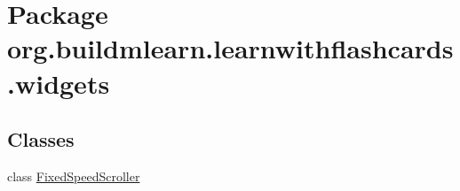 \hypertarget{namespaceorg_1_1buildmlearn_1_1learnwithflashcards_1_1widgets}{}\section{Package org.\+buildmlearn.\+learnwithflashcards.\+widgets}
\label{namespaceorg_1_1buildmlearn_1_1learnwithflashcards_1_1widgets}
\subsection*{Classes}
\begin{DoxyCompactItemize}
\item 
class \hyperlink{classorg_1_1buildmlearn_1_1learnwithflashcards_1_1widgets_1_1FixedSpeedScroller}{Fixed\+Speed\+Scroller}
\end{DoxyCompactItemize}

